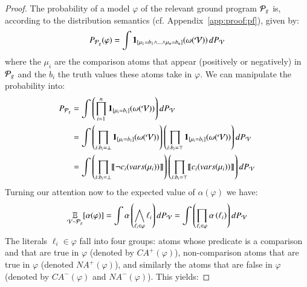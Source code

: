 \Labelequivalence*








\begin{proof} The probability of a model $\varphi$ of the relevant ground program $\mathcal{P}_g$ is, according to the distribution semantics (cf. Appendix~\ref{app:proof:pf}), given by:
    \begin{align}
        P_{\mathcal{P}_g}(\varphi) = \int \mathbf{1}_{[\mu_1=b_1\wedge\ldots\wedge \mu_n=b_n]}(\omega(\mathcal{V})) \mathop{}\!{d}{P_{\mathcal{V}}}
    \end{align}
    where the $\mu_i$ are the comparison atoms that appear (positively or negatively) in $\mathcal{P}_g$ and the $b_i$ the truth values these atoms take in $\varphi$.
    We can manipulate the probability into:
    \begin{align}
        P_{\mathcal{P}_g}
         & =
        \int \left( \prod_{i =1}^n \mathbf{1}_{[\mu_i=b_i]}(\omega(\mathcal{V})) \right) \mathop{}\!{d}{P_{\mathcal{V}}}                                                                                                         \\
         & =
        \int \left( \prod_{i: b_i=\bot} \mathbf{1}_{[\mu_i=b_i]}(\omega(\mathcal{V})) \right)  \left( \prod_{i: b_i=\top} \mathbf{1}_{[\mu_i=b_i]}(\omega(\mathcal{V})) \right)  \mathop{}\!{d}{P_{\mathcal{V}}} \\
         & =
        \int \left( \prod_{i: b_i=\bot} \llbracket\neg c_i(vars(\mu_i))\rrbracket \right)  \left( \prod_{i: b_i=\top}  \llbracket c_i(vars(\mu_i))\rrbracket  \right)  \mathop{}\!{d}{P_{\mathcal{V}}}
        \label{eq:program_prob_label_equi}
    \end{align}
    Turning our attention now to the expected value of $\alpha(\varphi)$ we have:
    \begin{align}
        \operatorname*{\mathbb{E}}_{\mathcal{V} \sim  \mathcal{P}_g} [\alpha( \varphi )]
        =
        \int \alpha \left( \bigwedge_{\ell_i \in \varphi} \ell_i \right) \mathop{}\!{d}{P_\mathcal{V}}
        =
        \int  \left( \prod_{\ell_i \in \varphi} \alpha \left(  \ell_i \right) \right)  \mathop{}\!{d}{P_\mathcal{V}}
    \end{align}
    The literals $\ell_i \in \varphi$ fall into four groups: atoms whose predicate is a comparison and that are true in $\varphi$ (denoted by $CA^+(\varphi)$), non-comparison atoms that are true in $\varphi$ (denoted $NA^+(\varphi)$), and similarly the atoms that are false in $\varphi$ (denoted by $CA^-(\varphi)$ and $NA^-(\varphi)$). This yields:

\end{proof}
